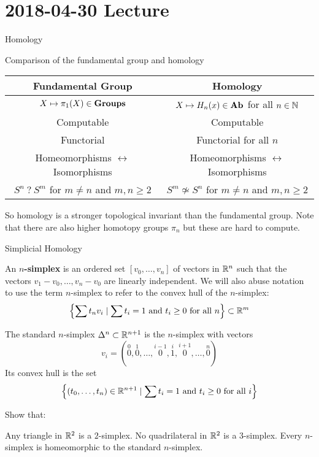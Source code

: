 \section{2018-04-30 Lecture}

Homology

Comparison of the fundamental group and homology

\begin{tabular}[]{| c | c |}
  \hline
  Fundamental Group & Homology \\
  \hline
  $X \mapsto \pi_1(X) \in \mathbf{Groups}$ & $X \mapsto H_n(x) \in \mathbf{Ab}$ for all $n \in \mathbb{N}$ \\
  Computable & Computable \\
  Functorial & Functorial for all $n$ \\
  Homeomorphisms $\leftrightarrow$ Isomorphisms & Homeomorphisms $\leftrightarrow$ Isomorphisms \\
  $S^n \ ? \ S^m$ for $m \neq n$ and $m,n \geq 2$ & $S^m \not\simeq S^n$ for $m \neq n$ and $m,n \geq 2$ \\
  \hline
\end{tabular}

So homology is a stronger topological invariant than the fundamental group.
Note that there are also higher homotopy groups $\pi_n$ but these are hard to compute.

Simplicial Homology

\begin{defn}
  An \textbf{$n$-simplex} is an ordered set $[v_0,\ldots,v_n]$ of vectors in $\mathbb{R}^n$ such that the vectors $v_1-v_0,\ldots,v_n-v_0$ are linearly independent.
  We will also abuse notation to use the term $n$-simplex to refer to the convex hull of the $n$-simplex:
  \[\left\{ \sum t_nv_i \mid \sum t_i=1 \text{ and } t_i \geq 0 \text{ for all } n \right\} \subset \mathbb{R}^m\]
\end{defn}

\begin{defn}
  The standard $n$-simplex $\Delta^n \subset \mathbb{R}^{n+1}$ is the $n$-simplex with vectors
  \[v_i = (\overset{0}{0},\overset{1}{0},\ldots,\overset{i-1}{0},\overset{i}{1},\overset{i+1}{0},\ldots,\overset{n}{0})\]
  Its convex hull is the set
\[ \left\{ (t_0,\ldots,t_n) \in \mathbb{R}^{n+1} \mid \sum t_i=1 \text{ and } t_i \geq 0 \text{ for all } i \right\} \]
\end{defn}

\begin{exer}
  Show that:
  \begin{enum}
    \io Any triangle in $\mathbb{R}^2$ is a $2$-simplex.
    \io No quadrilateral in $\mathbb{R}^2$ is a $3$-simplex.
    \io Every $n$-simplex is homeomorphic to the standard $n$-simplex.
  \end{enum}
\end{exer}

